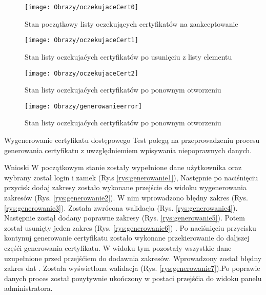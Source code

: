 \begin{enumerate*}
		\begin{figure}[ht!]
		
		\begin{minipage}{0.2\textwidth}
			\texttt{[image: Obrazy/oczekujaceCert0]}
			\caption{Stan początkowy listy oczekujących certyfikatów na zaakceptowanie }
			\label{rys:generowanieCert1}
		\end{minipage}
		\begin{minipage}{0.2\textwidth}
			\texttt{[image: Obrazy/oczekujaceCert1]}
			\caption{Stan listy oczekujaćych certyfikatów po usunięciu z listy elementu}
			\label{rys:generowanieCert2}
		\end{minipage}
		
		\begin{minipage}{0.2\textwidth}
			\texttt{[image: Obrazy/oczekujaceCert2]}
			\caption{Stan listy oczekujaćych certyfikatów po ponownym otworzeniu}
			\label{rys:generowanieCert3}
		\end{minipage}
	
	\begin{minipage}{0.2\textwidth}
		\texttt{[image: Obrazy/generowanieerror]}
		\caption{Stan listy oczekujaćych certyfikatów po ponownym otworzeniu}
		\label{rys:generowanieCert4}
	\end{minipage}
	
	\end{figure}
	
	
	
	\item  Wygenerowanie certyfikatu dostępowego
	Test polegą na przeprowadzeniu procesu generowania certyfikatu z uwzględniemiem wpisywania niepoprawnych danych.
	
	Wnioski W początkowym stanie zostały wypełnione dane użytkownika oraz wybrany został login i zamek (Ry.s \ref{rys:generowanie1}), Następnie po naciśnięciu przycisk dodaj zakresy zostało wykonane przejście do widoku  wygenerowania zakresów (Rys. \ref{rys:generowanie2}). W nim wprowadzono  błędny zakres (Rys. \ref{rys:generowanie3}). Została zwrócona walidacja (Rys. \ref{rys:generowanie4}). Następnie zostął dodany poprawne zakresy (Rys. \ref{rys:generowanie5}). Potem został usunięty jeden zakres (Rys. \ref{rys:generowanie6})   . Po naciśnięciu przycisku kontynuj generowanie certyfikatu zostało wykonane przekierowanie  do daljszej częśći generowania certyfikatu. W widoku tym pozostały wszystkie dane uzupełnione przed przejśćiem do dodawnia zakresów. Wprowadzony został błędny zakres dat . Została wyświetlona walidacja (Rys. \ref{rys:generowanie7}).Po poprawie danych proces został pozytywnie ukończony w postaci przejśćia do widoku panelu administratora.
	

\end{enumerate*}
